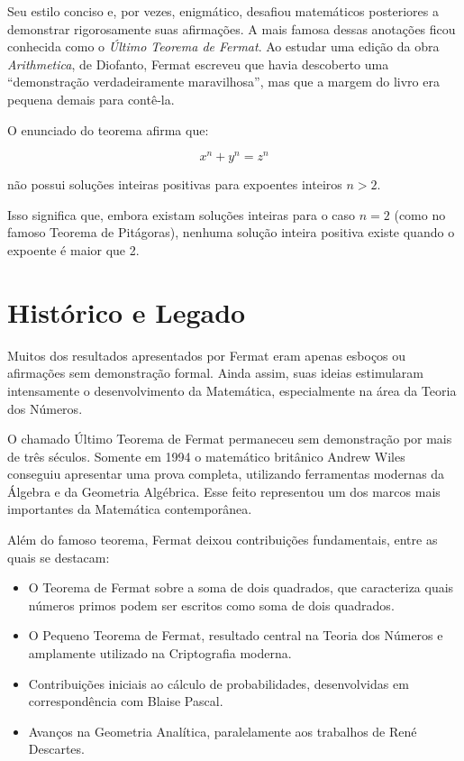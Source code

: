 \documentclass[12pt,a4paper,openright]{book}
\begin{document}
Seu estilo conciso e, por vezes, enigmático, desafiou matemáticos posteriores a demonstrar rigorosamente suas afirmações. A mais famosa dessas anotações ficou conhecida como o \textit{Último Teorema de Fermat}. Ao estudar uma edição da obra \textit{Arithmetica}, de Diofanto, Fermat escreveu que havia descoberto uma “demonstração verdadeiramente maravilhosa”, mas que a margem do livro era pequena demais para contê-la.

O enunciado do teorema afirma que:

\[
x^n + y^n = z^n
\]

não possui soluções inteiras positivas para expoentes inteiros \( n > 2 \).

Isso significa que, embora existam soluções inteiras para o caso \( n = 2 \) (como no famoso Teorema de Pitágoras), nenhuma solução inteira positiva existe quando o expoente é maior que 2.

\section{Histórico e Legado}

Muitos dos resultados apresentados por Fermat eram apenas esboços ou afirmações sem demonstração formal. Ainda assim, suas ideias estimularam intensamente o desenvolvimento da Matemática, especialmente na área da Teoria dos Números.

O chamado Último Teorema de Fermat permaneceu sem demonstração por mais de três séculos. Somente em 1994 o matemático britânico Andrew Wiles conseguiu apresentar uma prova completa, utilizando ferramentas modernas da Álgebra e da Geometria Algébrica. Esse feito representou um dos marcos mais importantes da Matemática contemporânea.

Além do famoso teorema, Fermat deixou contribuições fundamentais, entre as quais se destacam:

\begin{itemize}
    \item O Teorema de Fermat sobre a soma de dois quadrados, que caracteriza quais números primos podem ser escritos como soma de dois quadrados.
    \item O Pequeno Teorema de Fermat, resultado central na Teoria dos Números e amplamente utilizado na Criptografia moderna.
    \item Contribuições iniciais ao cálculo de probabilidades, desenvolvidas em correspondência com Blaise Pascal.
    \item Avanços na Geometria Analítica, paralelamente aos trabalhos de René Descartes.
\end{itemize}
\end{document}
